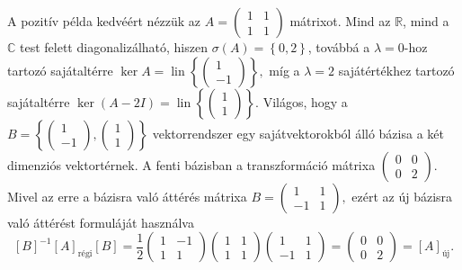 \documentclass[a4paper, showtrims]{memoir}
\theoremstyle{plain}
\theoremstyle{remark}
\theoremstyle{definition}
\DeclareMathOperator{\lin}{lin}
\newcommand{\uj}{\text{új}}
\newcommand{\rgi}{\text{régi}}
\begin{document}
A pozitív példa kedvéért nézzük az
\begin{math}
	A
	=
	\begin{pmatrix}
		1 & 1 \\1&1
	\end{pmatrix}
\end{math}
mátrixot.
Mind az $\mathbb{R}$,
mind a $\mathbb{C}$ test felett diagonalizálható,
hiszen $\sigma\left( A \right)=\left\{ 0,2 \right\}$, továbbá
a $\lambda=0$-hoz tartozó sajátaltérre
$\ker A=\lin\left\{
	\begin{pmatrix}
		1 \\-1
	\end{pmatrix}
	\right\},$
míg a $\lambda=2$ sajátértékhez tartozó sajátaltérre
\begin{math}
	\ker\left( A-2I \right)
	=
	\lin\left\{
	\begin{pmatrix}
		1 \\1
	\end{pmatrix}
	\right\}.
\end{math}
Világos, hogy a
\begin{math}
	B
	=
	\left\{
	\begin{pmatrix}
		1 \\-1
	\end{pmatrix},
	\begin{pmatrix}
		1 \\1
	\end{pmatrix}
	\right\}
\end{math}
vektorrendszer egy sajátvektorokból álló bázisa a két dimenziós vektortérnek.
A fenti bázisban a transzformáció mátrixa
\begin{math}
	\begin{pmatrix}
		0 & 0 \\
		0 & 2
	\end{pmatrix}.
\end{math}
Mivel az erre a bázisra való áttérés mátrixa
\begin{math}
	B=
	\begin{pmatrix}
		1  & 1 \\
		-1 & 1
	\end{pmatrix},
\end{math}
ezért az új bázisra való áttérést formuláját használva
\[
	[B]^{-1}[A]_{\rgi}[B]=
	\frac{1}{2}
	\begin{pmatrix}
		1 & -1 \\
		1 & 1
	\end{pmatrix}
	\begin{pmatrix}
		1 & 1 \\1&1
	\end{pmatrix}
	\begin{pmatrix}
		1  & 1 \\
		-1 & 1
	\end{pmatrix}
	=
	\begin{pmatrix}
		0 & 0 \\
		0 & 2
	\end{pmatrix}
	=[A]_{\uj}.
\]
\end{document}
